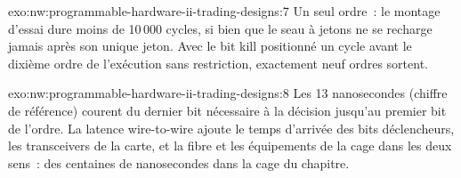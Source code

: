 \begin{solution}{exo:nw:programmable-hardware-ii-trading-designs:7}
Un seul ordre~: le montage d'essai dure moins de 10\,000 cycles, si bien que le seau à jetons ne se recharge jamais après son unique jeton. Avec le bit kill positionné un cycle
avant le dixième ordre de l'exécution sans restriction, exactement neuf ordres sortent.
\end{solution}

\begin{solution}{exo:nw:programmable-hardware-ii-trading-designs:8}
Les 13 nanosecondes (chiffre de référence) courent du dernier bit nécessaire à la décision jusqu'au premier bit de l'ordre. La latence wire-to-wire ajoute le
temps d'arrivée des bits déclencheurs, les transceivers de la carte, et la fibre et les équipements de la cage dans les deux sens~: des centaines de nanosecondes dans
la cage du chapitre.
\end{solution}

